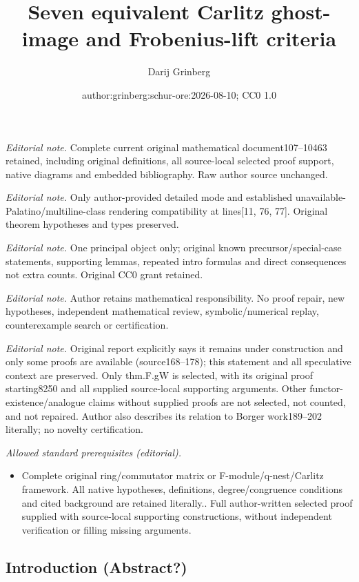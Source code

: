 \documentclass[numbers=enddot,12pt,final,onecolumn,notitlepage]{scrartcl}%
\title{Seven equivalent Carlitz ghost-image and Frobenius-lift criteria}
\author{Darij Grinberg}
\date{author:grinberg:schur-ore:2026-08-10; CC0 1.0}
\theoremstyle{definition}
\begin{document}
\maketitle
\noindent\textit{Editorial note.} Complete current original mathematical document107--10463 retained, including original definitions, all source-local selected proof support, native diagrams and embedded bibliography. Raw author source unchanged.\par\medskip
\noindent\textit{Editorial note.} Only author-provided detailed mode and established unavailable-Palatino/multiline-class rendering compatibility at lines[11, 76, 77]. Original theorem hypotheses and types preserved.\par\medskip
\noindent\textit{Editorial note.} One principal object only; original known precursor/special-case statements, supporting lemmas, repeated intro formulas and direct consequences not extra counts. Original CC0 grant retained.\par\medskip
\noindent\textit{Editorial note.} Author retains mathematical responsibility. No proof repair, new hypotheses, independent mathematical review, symbolic/numerical replay, counterexample search or certification.\par\medskip
\noindent\textit{Editorial note.} Original report explicitly says it remains under construction and only some proofs are available (source168--178); this statement and all speculative context are preserved. Only thm.F.gW is selected, with its original proof starting8250 and all supplied source-local supporting arguments. Other functor-existence/analogue claims without supplied proofs are not selected, not counted, and not repaired. Author also describes its relation to Borger work189--202 literally; no novelty certification.\par\medskip
\noindent\textit{Allowed standard prerequisites (editorial).}\begin{itemize}
\item Complete original ring/commutator matrix or F-module/q-nest/Carlitz framework. All native hypotheses, definitions, degree/congruence conditions and cited background are retained literally.. Full author-written selected proof supplied with source-local supporting constructions, without independent verification or filling missing arguments.
\end{itemize}\medskip
\subsection{Introduction (Abstract?)}
\end{document}
